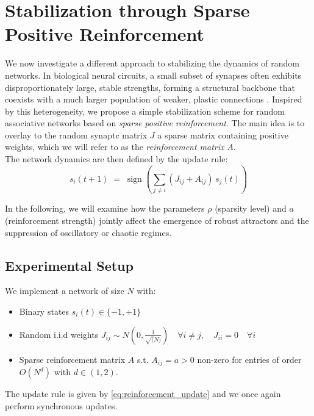 \documentclass[a4paper,12pt]{report}
\begin{document}
\section{Stabilization through Sparse Positive Reinforcement}

We now investigate a different approach to stabilizing the dynamics of random networks.
In biological neural circuits, a small subset of synapses often exhibits 
disproportionately large, stable strengths, forming a structural backbone that 
coexists with a much larger population of weaker, plastic connections 
\cite{Scholl2020, Forsythe2013}.  
Inspired by this heterogeneity, we propose a simple stabilization scheme for 
random associative networks based on {\em sparse positive reinforcement}.
The main idea is to overlay to the random synaptc matrix \(J\) a sparse matrix 
containing positive weights, which we will refer to as the 
\emph{reinforcement matrix} $A$. \\
The network dynamics are then defined by the update rule:
\begin{equation}\label{eq:reinforcement_update}
  s_i(t+1) \;=\; \operatorname{sign}\left(\sum_{j\neq i} \left(J_{ij}+A_{ij}\right)
  \,s_j(t) \right)
\end{equation}

In the following, we will examine how the parameters \(\rho\) (sparsity level) and 
\(a\) (reinforcement strength) jointly affect the emergence of robust attractors and 
the suppression of oscillatory or chaotic regimes.

\subsection{Experimental Setup}
We implement a network of size \(N\) with:
\begin{itemize}
  \item Binary states \(s_i(t) \in \{-1,+1\}\)
  \item Random i.i.d weights 
  $J_{ij} \sim N(0,\frac{1}{\sqrt(N)}) \hspace{1em} \forall i \neq j, \hspace{1em} J_{ii} = 0 \hspace{1em} \forall i$
  \item Sparse reinforcement matrix $A$ s.t. $A_{ij} = a > 0$ non-zero for entries of 
  order $O\left(N^d\right)$ with $d \in \left(1, 2\right)$.
\end{itemize}
The update rule is given by \eqref{eq:reinforcement_update} and we once again perform 
synchronous updates.
\vspace*{0.5em}
\end{document}
